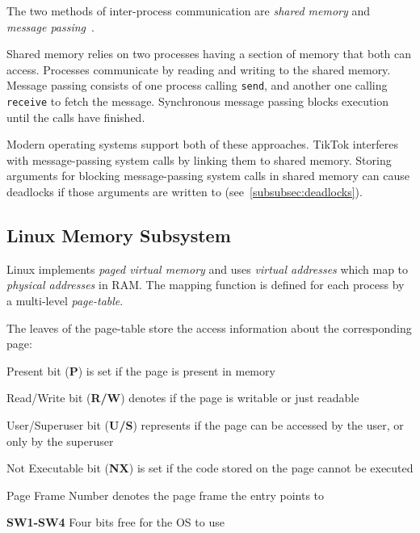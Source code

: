 \documentclass[conference]{IEEEtran}
\newcommand{\sysname}{TikTok}
\begin{document}
The two methods of inter-process communication are  \emph{shared memory} 
and \emph{message passing}~\cite{silberschatz2018operating}.

Shared memory relies on two processes having a section of memory that both can 
access. Processes communicate by reading and writing to the shared memory.
Message passing consists of one process calling \texttt{send}, and another one
calling \texttt{receive} to fetch the message. Synchronous message passing
blocks execution until the calls have finished.

Modern operating systems support both of these approaches. \sysname{} interferes
with message-passing system calls by linking them to shared memory. Storing
arguments for blocking message-passing system calls in shared memory can cause
deadlocks if those arguments are written to (see~\autoref{subsubsec:deadlocks}).

\subsection{Linux Memory Subsystem}
\label{subsec:vm}

Linux implements \emph{paged virtual memory} and uses \emph{virtual addresses}
which map to \emph{physical addresses} in RAM. The mapping function is defined
for each process by a multi-level \emph{page-table}.

The leaves of the page-table store the access information about the
corresponding page:
\begin{LaTeXdescription}
    \item[Present bit (\textbf{P})] is set if the page is present in memory
    \item[Read/Write bit (\textbf{R/W})] denotes if the page is writable or just
         readable
    \item[User/Superuser bit (\textbf{U/S})] represents if the page can be 
    accessed by the user, or only by the superuser
    \item[Not Executable bit (\textbf{NX})] is set if the code stored on the 
    page cannot be executed
    \item[Page Frame Number] denotes the page frame the entry points to
    \item[\textbf{SW1-SW4}] Four bits free for the OS to use
\end{LaTeXdescription}
\end{document}
